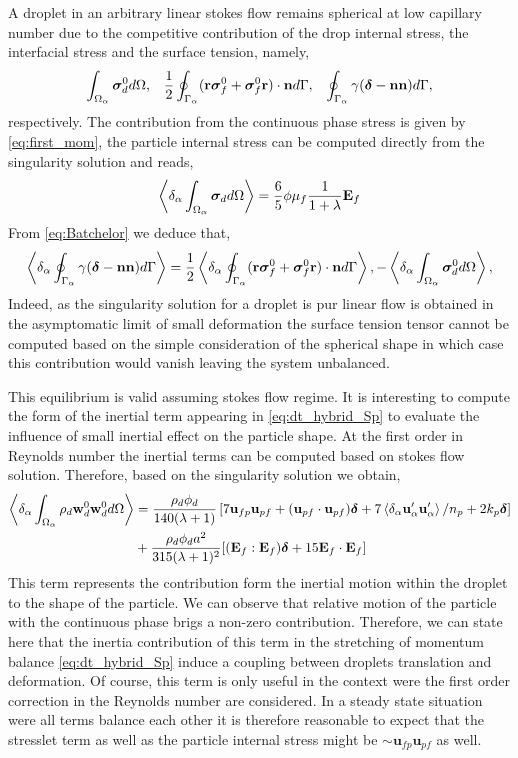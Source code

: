 A droplet in an arbitrary linear stokes flow remains spherical at low capillary number due to the competitive contribution of the drop internal stress, the interfacial stress and the surface tension, namely, 
\begin{align*}
    \int_{\Omega_\alpha} \bm{\sigma}_d^0 d\Omega,
    &&\frac{1}{2}\oint_{\Gamma_\alpha} (\textbf{r}\bm\sigma_f^0+\bm\sigma_f^0\textbf{r})\cdot \textbf{n} d\Gamma,
    &&\oint_{\Gamma_\alpha} \gamma(\bm\delta - \textbf{nn}) d\Gamma,
\end{align*}
respectively. 
The contribution from the continuous phase stress is given by \ref{eq:first_mom}, the particle internal stress can be computed directly from the singularity solution and reads, 
\begin{equation*}
    \left<\delta_\alpha \int_{\Omega_\alpha} \bm{\sigma}_d d\Omega\right>
    = \frac{6}{5}\phi \mu_f \frac{1}{1+\lambda} \textbf{E}_f
\end{equation*}
From  \ref{eq:Batchelor} we deduce that, 
\begin{equation*}
    \left<\delta_\alpha \oint_{\Gamma_\alpha} \gamma(\bm\delta - \textbf{nn}) d\Gamma\right>
    = 
    \frac{1}{2}\left<\delta_\alpha \oint_{\Gamma_\alpha} (\textbf{r}\bm\sigma_f^0+\bm\sigma_f^0\textbf{r})\cdot \textbf{n} d\Gamma\right>,
    - \left<\delta_\alpha \int_{\Omega_\alpha} \bm{\sigma}_d^0 d\Omega\right>,
\end{equation*}
Indeed, as the singularity solution for a droplet is pur linear flow is obtained in the asymptomatic limit of small deformation the surface tension tensor cannot be computed based on the simple consideration of the spherical shape in which case this contribution would vanish leaving the system unbalanced.

This equilibrium is valid assuming stokes flow regime. 
It is interesting to compute the form of the inertial term appearing in \ref{eq:dt_hybrid_Sp} to evaluate the influence of small inertial effect on the particle shape. 
At the first order in Reynolds number the inertial terms can be computed based on stokes flow solution. 
Therefore, based on the singularity solution we obtain, 
\begin{align*}
    \left<\delta_\alpha \int_{\Omega_\alpha} \rho_d \textbf{w}_d^0  \textbf{w}_d^0  d\Omega\right>
    &= \frac{\rho_d \phi_d}{140(\lambda +1 )}
    \left[
        7\textbf{u}_{fp}\textbf{u}_{pf} 
    + (\textbf{u}_{pf}\cdot \textbf{u}_{pf})\bm\delta
    + 7\left<\delta_\alpha \textbf{u}_\alpha'\textbf{u}_\alpha'\right>/n_p 
    + 2k_p \bm\delta
    \right]\\
    &+ \frac{\rho_d \phi_d a^2}{315 (\lambda + 1)^2}[(\textbf{E}_f : \textbf{E}_f)\bm\delta+15\textbf{E}_f\cdot \textbf{E}_f]\\
\end{align*}
This term represents the contribution form the inertial motion within the droplet to the shape of the particle. 
We can observe that relative motion of the particle with the continuous phase brigs a non-zero contribution. 
Therefore, we can state here that the inertia contribution of this term in the stretching of momentum balance \ref{eq:dt_hybrid_Sp} induce a coupling between droplets translation and deformation. 
Of course, this term is only useful in the context were the first order correction in the Reynolds number are considered. 
In a steady state situation were all terms balance each other it is therefore reasonable to expect that the stresslet term as well as the particle internal stress might be $\sim \textbf{u}_{fp}\textbf{u}_{pf} $ as well. 




